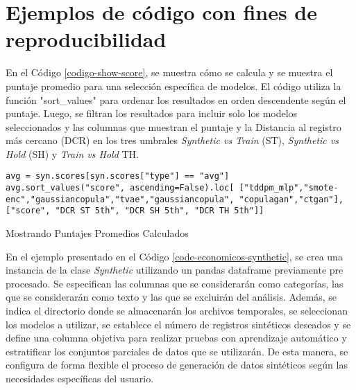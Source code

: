 \section{Ejemplos de código con fines de reproducibilidad}
\label{anexo:reproducibilidad}

En el Código \ref{codigo-show-score}, se muestra cómo se calcula y se muestra el puntaje promedio para una selección específica de modelos. El código utiliza la función "sort\_values" para ordenar los resultados en orden descendente según el puntaje. Luego, se filtran los resultados para incluir solo los modelos seleccionados y las columnas que muestran el puntaje y la Distancia al registro más cercano (DCR) en los tres umbrales \emph{Synthetic vs Train} (ST), \emph{Synthetic vs Hold} (SH) y \emph{Train vs Hold} TH.
\begin{listing}[H]
    \begin{verbatim}
avg = syn.scores[syn.scores["type"] == "avg"]
avg.sort_values("score", ascending=False).loc[ ["tddpm_mlp","smote-enc","gaussiancopula","tvae","gaussiancopula", "copulagan","ctgan"], ["score", "DCR ST 5th", "DCR SH 5th", "DCR TH 5th"]]
    \end{verbatim}
\caption{Mostrando Puntajes Promedios Calculados}
\label{codigo-show-score}
\end{listing}

En el ejemplo presentado en el Código \ref{code-economicos-synthetic}, se crea una instancia de la clase \emph{Synthetic} utilizando un pandas dataframe previamente pre procesado. Se especifican las columnas que se considerarán como categorías, las que se considerarán como texto y las que se excluirán del análisis. Además, se indica el directorio donde se almacenarán los archivos temporales, se seleccionan los modelos a utilizar, se establece el número de registros sintéticos deseados y se define una columna objetiva para realizar pruebas con aprendizaje automático y estratificar los conjuntos parciales de datos que se utilizarán. De esta manera, se configura de forma flexible el proceso de generación de datos sintéticos según las necesidades específicas del usuario.

